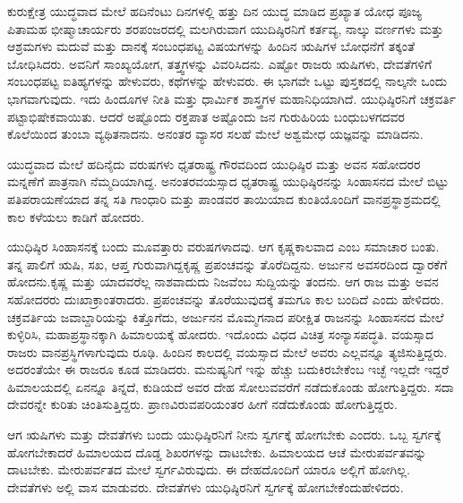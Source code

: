 \vskip 0.2cm

ಕುರುಕ್ಷೇತ್ರ ಯುದ್ಧವಾದ ಮೇಲೆ ಹದಿನೆಂಟು ದಿನಗಳಲ್ಲಿ ಹತ್ತು ದಿನ ಯುದ್ಧ ಮಾಡಿದ ಪ್ರಖ್ಯಾತ ಯೋಧ ಪೂಜ್ಯ ಪಿತಾಮಹ ಭೀಷ್ಮಾಚಾರ್ಯರು ಶರಪಂಜರದಲ್ಲಿ ಮಲಗಿರುವಾಗ ಯುದಿಷ್ಠಿರನಿಗೆ ಕರ್ತವ್ಯ, ನಾಲ್ಕು ವರ್ಣಗಳು ಮತ್ತು ಆಶ್ರಮಗಳು ಮದುವೆ ಮತ್ತು ದಾನಕ್ಕೆ ಸಂಬಂಧಪಟ್ಟ ವಿಷಯಗಳನ್ನು ಹಿಂದಿನ ಋಷಿಗಳ ಬೋಧನೆಗೆ ತಕ್ಕಂತೆ ಬೋಧಿಸಿದರು. ಅವನಿಗೆ ಸಾಂಖ್ಯಯೋಗ, ತತ್ತ್ವಗಳನ್ನು ವಿವರಿಸಿದನು. ಎಷ್ಟೋ ರಾಜರು ಋಷಿಗಳು, ದೇವತೆಗಳಿಗೆ ಸಂಬಂಧಪಟ್ಟ ಐತಿಹ್ಯಗಳನ್ನು ಹೇಳುವರು, ಕಥೆಗಳನ್ನು ಹೇಳುವರು. ಈ ಭಾಗವೇ ಒಟ್ಟು ಪುಸ್ತಕದಲ್ಲಿ ನಾಲ್ಕನೇ ಒಂದು ಭಾಗವಾಗುವುದು. ಇದು ಹಿಂದೂಗಳ ನೀತಿ ಮತ್ತು ಧಾರ್ಮಿಕ ಶಾಸ್ತ್ರಗಳ ಮಹಾನಿಧಿಯಾಗಿದೆ. ಯುಧಿಷ್ಠಿರನಿಗೆ ಚಕ್ರವರ್ತಿ ಪಟ್ಟಾಭಿಷೇಕವಾಯಿತು. ಆದರೆ ಅಷ್ಟೊಂದು ರಕ್ತಪಾತ ಅಷ್ಟೊಂದು ಜನ ಗುರುಹಿರಿಯ ಬಂಧುಬಳಗದವರ ಕೊಲೆಯಿಂದ ತುಂಬಾ ವ್ಯಥಿತನಾದನು. ಅನಂತರ ವ್ಯಾಸರ ಸಲಹೆ ಮೇಲೆ ಅಶ್ವಮೇಧ ಯಜ್ಞವನ್ನು ಮಾಡಿದನು.

\vskip 0.1cm

ಯುದ್ಧವಾದ ಮೇಲೆ ಹದಿನೈದು ವರುಷಗಳು ಧೃತರಾಷ್ಟ್ರ ಗೌರವದಿಂದ ಯುಧಿಷ್ಠಿರ ಮತ್ತು ಅವನ ಸಹೋದರರ ಮನ್ನಣೆಗೆ ಪಾತ್ರನಾಗಿ ನೆಮ್ಮದಿಯಾಗಿದ್ದ. ಅನಂತರ\break ವಯಸ್ಸಾದ ಧೃತರಾಷ್ಟ್ರ ಯುಧಿಷ್ಠಿರನನ್ನು ಸಿಂಹಾಸನದ ಮೇಲೆ ಬಿಟ್ಟು ಪತಿಪರಾಯಣೆಯಾದ ತನ್ನ ಸತಿ ಗಾಂಧಾರಿ ಮತ್ತು ಪಾಂಡವರ ತಾಯಿಯಾದ ಕುಂತಿಯೊಂದಿಗೆ ವಾನಪ್ರಸ್ಥಾಶ್ರಮದಲ್ಲಿ ಕಾಲ ಕಳೆಯಲು ಕಾಡಿಗೆ ಹೋದರು.

\vskip 0.1cm

ಯುಧಿಷ್ಠಿರ ಸಿಂಹಾಸನಕ್ಕೆ ಬಂದು ಮೂವತ್ತಾರು ವರುಷಗಳಾದವು. ಆಗ ಕೃಷ್ಣ\break ಕಾಲವಾದ ಎಂಬ ಸಮಾಚಾರ ಬಂತು. ತನ್ನ ಪಾಲಿಗೆ ಋಷಿ, ಸಖ, ಆಪ್ತ ಗುರುವಾಗಿದ್ದ\break ಕೃಷ್ಣ ಪ್ರಪಂಚವನ್ನು ತೊರೆದಿದ್ದನು. ಅರ್ಜುನ ಅವಸರದಿಂದ ದ್ವಾರಕೆಗೆ ಹೋದನು.\break ಕೃಷ್ಣ ಮತ್ತು ಯಾದವರೆಲ್ಲ ನಾಶವಾದುದು ನಿಜವೆಂಬ ಸುದ್ದಿಯನ್ನು ತಂದನು. ಆಗ ರಾಜ ಮತ್ತು ಅವನ ಸಹೋದರರು ದುಃಖಾಕ್ರಾಂತರಾದರು. ಪ್ರಪಂಚವನ್ನು ತೊರೆಯುವುದಕ್ಕೆ ತಮಗೂ ಕಾಲ ಬಂದಿದೆ ಎಂದು ಹೇಳಿದರು. ಚಕ್ರವರ್ತಿಯ ಜವಾಬ್ದಾರಿಯನ್ನು ಕಿತ್ತೊಗೆದು, ಅರ್ಜುನನ ಮೊಮ್ಮಗನಾದ ಪರೀಕ್ಷಿತ ರಾಜನನ್ನು ಸಿಂಹಾಸನದ ಮೇಲೆ ಕುಳ್ಳಿರಿಸಿ, ಮಹಾಪ್ರಸ್ಥಾನಕ್ಕಾಗಿ ಹಿಮಾಲಯಕ್ಕೆ ಹೋದರು. ಇದೊಂದು ವಿಧದ ವಿಚಿತ್ರ ಸಂನ್ಯಾಸಪದ್ಧತಿ. ವಯಸ್ಸಾದ ರಾಜರು ವಾನಪ್ರಸ್ಥಿಗಳಾಗುವುದು ರೂಢಿ. ಹಿಂದಿನ ಕಾಲದಲ್ಲಿ ವಯಸ್ಸಾದ ಮೇಲೆ ಅವರು ಎಲ್ಲವನ್ನೂ ತ್ಯಜಿಸುತ್ತಿದ್ದರು. ಅದರಂತೆಯೇ ಈ ರಾಜರೂ ಕೂಡ ಮಾಡಿದರು. ಮನುಷ್ಯನಿಗೆ ಇನ್ನು ಹೆಚ್ಚು ಬದುಕಿರಬೇಕೆಂಬ ಇಚ್ಛೆ ಇಲ್ಲದೇ ಇದ್ದರೆ ಹಿಮಾಲಯದಲ್ಲಿ ಏನನ್ನೂ ತಿನ್ನದೆ, ಕುಡಿಯದೆ ಅವರ ದೇಹ ಸೋಲುವವರೆಗೆ ನಡೆದುಕೊಂಡು ಹೋಗುತ್ತಿದ್ದರು. ಸದಾ ದೇವರನ್ನೇ ಕುರಿತು ಚಿಂತಿಸುತ್ತಿದ್ದರು. ಪ್ರಾಣವಿರುವ\break ಪರಿಯಂತರ ಹೀಗೆ ನಡೆದುಕೊಂಡು ಹೋಗುತ್ತಿದ್ದರು.

\vskip 0.1cm

ಆಗ ಋಷಿಗಳು ಮತ್ತು ದೇವತೆಗಳು ಬಂದು ಯುಧಿಷ್ಠಿರನಿಗೆ ನೀನು ಸ್ವರ್ಗಕ್ಕೆ ಹೋಗಬೇಕು ಎಂದರು. ಒಬ್ಬ ಸ್ವರ್ಗಕ್ಕೆ ಹೋಗಬೇಕಾದರೆ ಹಿಮಾಲಯದ ದೊಡ್ಡ ಶಿಖರಗಳನ್ನು ದಾಟಬೇಕು. ಹಿಮಾಲಯದ ಆಚೆ ಮೇರುಪರ್ವತವನ್ನು ದಾಟಬೇಕು. ಮೇರುಪರ್ವತದ ಮೇಲೆ ಸ್ವರ್ಗವಿರುವುದು. ಈ ದೇಹದೊಂದಿಗೆ ಯಾರೂ ಅಲ್ಲಿಗೆ ಹೋಗಿಲ್ಲ. ದೇವತೆಗಳು ಅಲ್ಲಿ ವಾಸ ಮಾಡುವರು. ದೇವತೆಗಳು ಯುಧಿಷ್ಠಿರನಿಗೆ ಸ್ವರ್ಗಕ್ಕೆ ಹೋಗಬೇಕೆಂದು\break ಹೇಳಿದರು.

